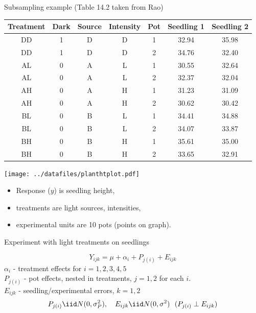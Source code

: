\begin{LARGE}
\centerline{Subsampling example (Table 14.2 taken from Rao)}
\begin{small}
\begin{center}
\begin{tabular}{ccccc|cc}
Treatment & Dark & Source & Intensity & Pot & Seedling 1 & Seedling 2 \\ \hline
DD          &        1       &        D         &          D          &       1       &      32.94      &      35.98 \\
DD          &        1       &        D         &          D          &       2       &      34.76      &      32.40 \\
AL          &        0       &        A         &          L          &       1       &      30.55      &      32.64 \\
AL          &        0       &        A         &          L          &       2       &      32.37      &      32.04 \\
AH          &        0       &        A         &          H          &       1       &      31.23      &      31.09 \\
AH          &        0       &        A         &          H          &       2       &      30.62      &      30.42 \\
BL          &        0       &        B         &          L          &       1       &      34.41      &      34.88 \\
BL          &        0       &        B         &          L          &       2       &      34.07      &      33.87 \\
BH          &        0       &        B         &          H          &       1       &      35.61      &      35.00 \\
BH          &        0       &        B         &          H          &       2       &      33.65      &      32.91 \\ \hline
\end{tabular}
\end{center}
\end{small}
\begin{center}
\texttt{[image: ../datafiles/planthtplot.pdf]}
\end{center}
\begin{itemize}
\item Response ($y$) is seedling height, 
\item treatments are light sources, intensities,
\item experimental units are 10 pots (points on graph).
\end{itemize}
\newpage
\centerline{Experiment with light treatments on seedlings}
$$ Y_{ijk} = \mu + \alpha_i + P_{j(i)} + E_{ijk} $$
$\alpha_i$ - treatment effects for $i=1,2,3,4,5$ \\
$P_{j(i)}$ - pot effects, nested in treatments, $j=1,2$ for each $i$. \\
$E_{ijk}$ -  seedling/experimental errors, $k=1,2$
$$P_{j(i)} \iid N(0,\sigma_P^2), \ \ \ E_{ijk} \iid N(0,\sigma^2) \ \ 
(P_{j(i)} \perp E_{ijk})$$


\end{LARGE}
